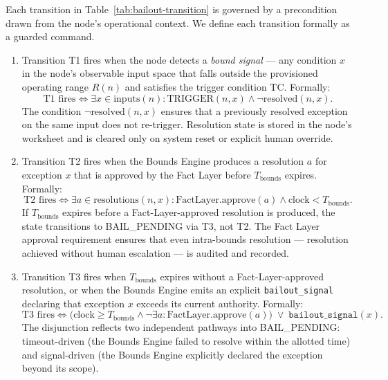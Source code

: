 Each transition in Table~\ref{tab:bailout-transition} is governed by a precondition drawn from the node's operational context. We define each transition formally as a guarded command.

\begin{enumerate}
\item[\textbf{T1: IDLE $\rightarrow$ BOUNDED (trigger).}] Transition T1 fires when the node detects a \emph{bound signal} — any condition $x$ in the node's observable input space that falls outside the provisioned operating range $R(n)$ and satisfies the trigger condition TC. Formally:
\begin{equation}
\text{T1 fires} \iff \exists x \in \text{inputs}(n) : \text{TRIGGER}(n, x) \land \neg\text{resolved}(n, x). \tag{T1}
\end{equation}
The condition $\neg\text{resolved}(n, x)$ ensures that a previously resolved exception on the same input does not re-trigger. Resolution state is stored in the node's worksheet and is cleared only on system reset or explicit human override.

\item[\textbf{T2: BOUNDED $\rightarrow$ HUMAN\_ACKNOWLEDGED (intra-bounds resolution).}] Transition T2 fires when the Bounds Engine produces a resolution $a$ for exception $x$ that is approved by the Fact Layer before $T_{\text{bounds}}$ expires. Formally:
\begin{equation}
\text{T2 fires} \iff \exists a \in \text{resolutions}(n, x) : \text{FactLayer.approve}(a) \land \text{clock} < T_{\text{bounds}}. \tag{T2}
\end{equation}
If $T_{\text{bounds}}$ expires before a Fact-Layer-approved resolution is produced, the state transitions to BAIL\_PENDING via T3, not T2. The Fact Layer approval requirement ensures that even intra-bounds resolution — resolution achieved without human escalation — is audited and recorded.

\item[\textbf{T3: BOUNDED $\rightarrow$ BAIL\_PENDING (escalation).}] Transition T3 fires when $T_{\text{bounds}}$ expires without a Fact-Layer-approved resolution, or when the Bounds Engine emits an explicit \texttt{bailout\_signal} declaring that exception $x$ exceeds its current authority. Formally:
\begin{equation}
\text{T3 fires} \iff \bigl(\text{clock} \geq T_{\text{bounds}} \land \neg\exists a : \text{FactLayer.approve}(a)\bigr) \;\lor\; \texttt{bailout\_signal}(x). \tag{T3}
\end{equation}
The disjunction reflects two independent pathways into BAIL\_PENDING: timeout-driven (the Bounds Engine failed to resolve within the allotted time) and signal-driven (the Bounds Engine explicitly declared the exception beyond its scope).


\end{enumerate}
